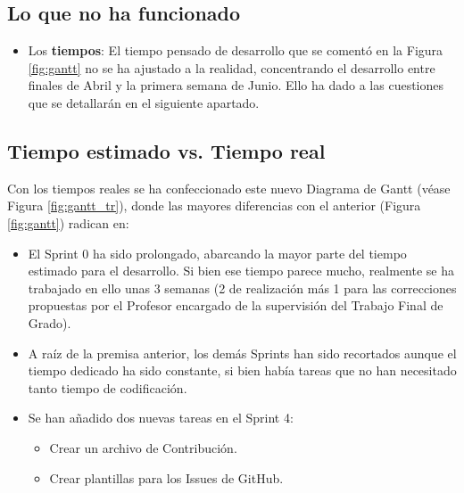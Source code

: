 \subsection{Lo que no ha funcionado}
\begin{itemize}
	\item Los \textbf{tiempos}: El tiempo pensado de desarrollo que se comentó en la Figura \ref{fig:gantt} no se ha ajustado a la realidad, concentrando el desarrollo entre finales de Abril y la primera semana de Junio. Ello ha dado a las cuestiones que se detallarán en el siguiente apartado.
\end{itemize}
\subsection{Tiempo estimado vs. Tiempo real}
Con los tiempos reales se ha confeccionado este nuevo Diagrama de Gantt (véase Figura \ref{fig:gantt_tr}), donde las mayores diferencias con el anterior (Figura \ref{fig:gantt}) radican en:
\begin{itemize}
	\item El Sprint 0 ha sido prolongado, abarcando la mayor parte del tiempo estimado para el desarrollo. Si bien ese tiempo parece mucho, realmente se ha trabajado en ello unas 3 semanas (2 de realización más 1 para las correcciones propuestas por el Profesor encargado de la supervisión del Trabajo Final de Grado).
	\item A raíz de la premisa anterior, los demás Sprints han sido recortados aunque el tiempo dedicado ha sido constante, si bien había tareas que no han necesitado tanto tiempo de codificación.
	\item Se han añadido dos nuevas tareas en el Sprint 4:
	\begin{itemize}
		\item Crear un archivo de Contribución.
		\item Crear plantillas para los Issues de GitHub.
	\end{itemize}
	
\end{itemize}

